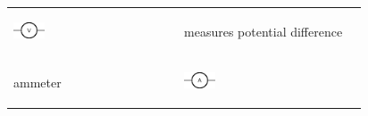 \begin{center}
\begin{xtabular*}{\mytablewidth}[t]{|p{10\mystarwidth}|p{10\mystarwidth}|p{10\mystarwidth}|}
    
        
                    
    \setcounter{subfigure}{0}

\label{m38516*id63089}
    \begin{center}
    \label{m38516*id63089!!!underscore!!!media}\label{m38516*id63089!!!underscore!!!printimage}\includegraphics[width=0.2\textwidth]{col11305.imgs/m38516_PG10C9_006.png} %
        
      \vspace{2pt}
    \vspace{.1in}
    
    \end{center}



    \addtocounter{footnote}{-0}
    
                   &
    
    
        measures potential difference%
     \tabularnewline{}
    
    
        ammeter &
    
    
        
                    
    \setcounter{subfigure}{0}

\label{m38516*id63126}
    \begin{center}
    \label{m38516*id63126!!!underscore!!!media}\label{m38516*id63126!!!underscore!!!printimage}\includegraphics[width=0.2\textwidth]{col11305.imgs/m38516_PG10C9_007.png} %
        

\end{center}
\end{xtabular*}
\end{center}
